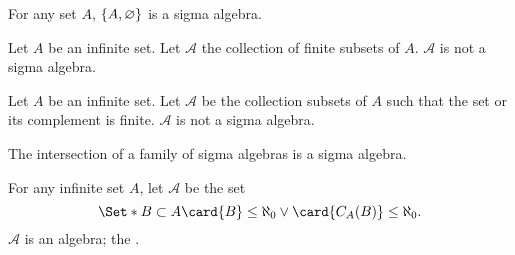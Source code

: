 \begin{expl}
  For any set $A$,
  $\{A, \varnothing\}$ is a sigma algebra.
\end{expl}

\begin{expl}
  Let $A$ be an infinite set.
  Let $\mathcal{A}$ the collection
  of finite subsets of $A$.
  $\mathcal{A}$ is not a sigma algebra.
\end{expl}

\begin{expl}
  Let $A$ be an infinite set.
  Let $\mathcal{A}$ be the collection
  subsets of $A$ such that the set or its
  complement is finite.
  $\mathcal{A}$ is not a sigma algebra.
\end{expl}


\begin{prop}
  The intersection of a family of sigma algebras is
  a sigma algebra.
  \label{sigma_algebra:sigmaintersection}
\end{prop}

\begin{expl}
  For any infinite set $A$,
  let $\mathcal{A}$ be the set
  $$
  \Set*{
    B \subset A
  }{
    \card{B} \leq \aleph_0 \lor
    \card{C_{A}(B)} \leq \aleph_0
  }.
  $$
  $\mathcal{A}$ is an algebra;
  the
  .
\end{expl}

\strats
